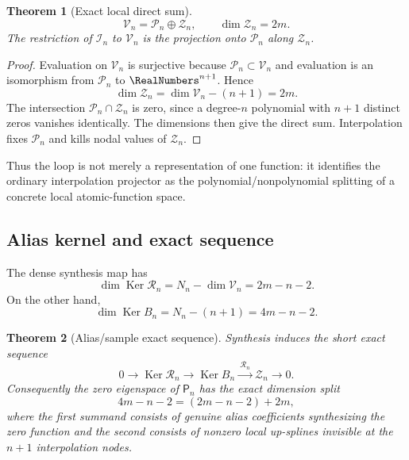 \documentclass[11pt,oneside]{article}
\numberwithin{equation}{section}
\newtheorem{theorem}{Theorem}[section]
\theoremstyle{definition}
\theoremstyle{remark}
\newcommand{\Ker}{\operatorname{Ker}}
\newcommand{\PiN}{\mathcal P}
\newcommand{\Lag}{\mathcal I}
\newcommand{\Synth}{\mathcal R}
\newcommand{\Proj}{\mathsf P}
\begin{document}
\begin{theorem}[Exact local direct sum]
\label{thm:V-direct-sum}
\begin{equation}
 \boxed{
 \mathcal V_n=\PiN_n\oplus\mathcal Z_n,
 \qquad \dim\mathcal Z_n=2m.
 }
 \label{eq:V-direct-sum}
\end{equation}
The restriction of $\Lag_n$ to $\mathcal V_n$ is the projection onto
$\PiN_n$ along $\mathcal Z_n$.
\end{theorem}

\begin{proof}
Evaluation on $\mathcal V_n$ is surjective because $\PiN_n\subset\mathcal
V_n$ and evaluation is an isomorphism from $\PiN_n$ to $\RealNumbers^{n+1}$.  Hence
\[
 \dim\mathcal Z_n=\dim\mathcal V_n-(n+1)=2m.
\]
The intersection $\PiN_n\cap\mathcal Z_n$ is zero, since a degree-$n$
polynomial with $n+1$ distinct zeros vanishes identically.  The dimensions
then give the direct sum.  Interpolation fixes $\PiN_n$ and kills nodal
values of $\mathcal Z_n$.
\end{proof}

Thus the loop is not merely a representation of one function: it identifies
the ordinary interpolation projector as the polynomial/nonpolynomial
splitting of a concrete local atomic-function space.

\subsection{Alias kernel and exact sequence}

The dense synthesis map has
\begin{equation}
 \dim\Ker\Synth_n
 =N_n-\dim\mathcal V_n
 =2m-n-2.
 \label{eq:alias-kernel-dim}
\end{equation}
On the other hand,
\begin{equation}
 \dim\Ker B_n=N_n-(n+1)=4m-n-2.
 \label{eq:sample-kernel-dim}
\end{equation}

\begin{theorem}[Alias/sample exact sequence]
\label{thm:exact-sequence}
Synthesis induces the short exact sequence
\begin{equation}
 0\longrightarrow\Ker\Synth_n
 \longrightarrow\Ker B_n
 \xrightarrow{\ \Synth_n\ }\mathcal Z_n
 \longrightarrow0.
 \label{eq:exact-sequence}
\end{equation}
Consequently the zero eigenspace of $\Proj_n$ has the exact dimension split
\begin{equation}
 \boxed{
 4m-n-2=(2m-n-2)+2m,
 }
 \label{eq:zero-split}
\end{equation}
where the first summand consists of genuine alias coefficients synthesizing
the zero function and the second consists of nonzero local up-splines
invisible at the $n+1$ interpolation nodes.
\end{theorem}
\end{document}
